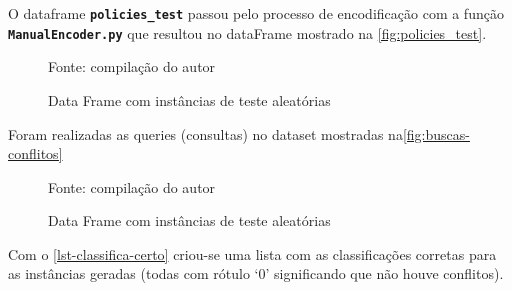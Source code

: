O dataframe \texttt{\textbf{policies\_test}} passou pelo processo de encodificação com a função \texttt{\textbf{ManualEncoder.py}} que resultou no dataFrame mostrado na \autoref{fig:policies_test}.

\begin{figure}[H]
	\centering
	\caption{Data Frame com instâncias de teste aleatórias}
	
	\label{fig:policies_test}
	{\scriptsize Fonte: compilação do autor}
\end{figure}

Foram realizadas as queries (consultas) no dataset mostradas na\autoref{fig:buscas-conflitos}

\begin{figure}[H]
	\centering
	\caption{Data Frame com instâncias de teste aleatórias}
	
	\label{fig:buscas-conflitos}
	{\scriptsize Fonte: compilação do autor}
\end{figure} 

Com o \autoref{lst-classifica-certo} criou-se uma lista com as classificações corretas para as instâncias geradas (todas com rótulo `0' significando que não houve conflitos).

